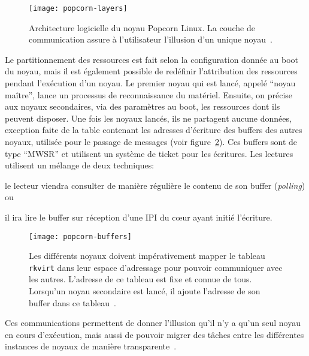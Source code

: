       \begin{figure}[ht]
        \centering
        \texttt{[image: popcorn-layers]}
        \caption{Architecture logicielle du noyau Popcorn Linux. La couche de
          communication assure à l'utilisateur l'illusion d'un unique
          noyau~\citep{barbalacepopcorn}.}
        \label{fig:popcorn-layers}
      \end{figure}

      Le partitionnement des ressources est fait selon la configuration donnée
      au boot du noyau, mais il est également possible de redéfinir
      l'attribution des ressources pendant l'exécution d'un noyau. Le premier
      noyau qui est lancé, appelé ``noyau maître'', lance un processus de
      reconnaissance du matériel. Ensuite, on précise aux noyaux secondaires,
      via des paramètres au boot, les ressources dont ils peuvent disposer. Une
      fois les noyaux lancés, ils ne partagent aucune données, exception faite
      de la table contenant les adresses d’écriture des buffers des autres
      noyaux, utilisée pour le passage de messages (voir
      figure~\ref{fig:popcorn-buf}). Ces buffers sont de type
      ``MWSR'' et utilisent un
      système de ticket pour les écritures. Les lectures utilisent un mélange de
      deux techniques:\benumline \item le lecteur viendra consulter de manière
      régulière le contenu de son buffer (\textit{polling}) ou \item il ira lire
      le buffer sur réception d’une IPI du c\oe ur ayant initié l’écriture\eenumline.

      \begin{figure}[ht]
        \centering
        \texttt{[image: popcorn-buffers]}
        \caption{Les différents noyaux doivent impérativement mapper le tableau
          \texttt{rkvirt} dans leur espace d'adressage pour pouvoir communiquer
          avec les autres. L'adresse de ce tableau est fixe et connue de tous.
          Lorsqu'un noyau secondaire est lancé, il ajoute l'adresse de son
          buffer dans ce tableau~\citep{barbalacepopcorn}.}
        \label{fig:popcorn-buf}
      \end{figure}

      Ces communications permettent de donner l’illusion qu’il n’y a qu’un seul
      noyau en cours d’exécution, mais aussi de pouvoir migrer des tâches entre
      les différentes instances de noyaux de manière
      transparente~\citep{katz2013popcorn}.\\

